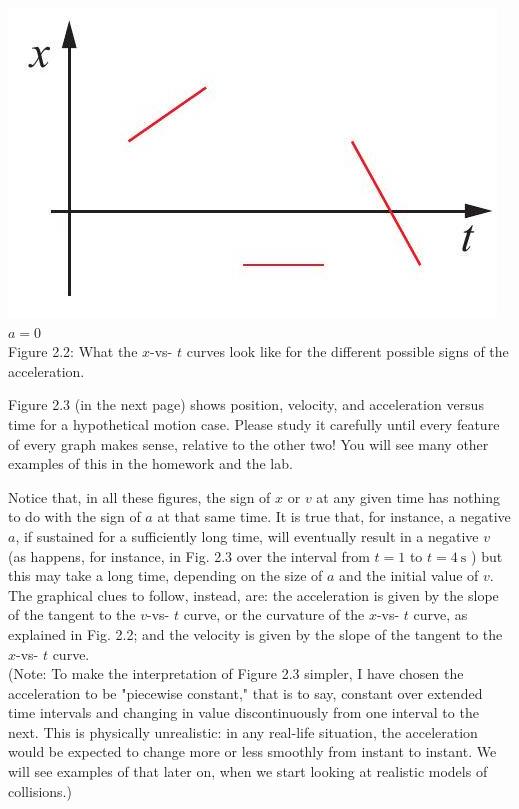 \documentclass[10pt]{article}
\begin{document}
\includegraphics[max width=\textwidth, center]{2024_09_14_9969b06773f10b6936e8g-055(1)}\\
$a=0$\\
Figure 2.2: What the $x$-vs- $t$ curves look like for the different possible signs of the acceleration.

Figure 2.3 (in the next page) shows position, velocity, and acceleration versus time for a hypothetical motion case. Please study it carefully until every feature of every graph makes sense, relative to the other two! You will see many other examples of this in the homework and the lab.

Notice that, in all these figures, the sign of $x$ or $v$ at any given time has nothing to do with the sign of $a$ at that same time. It is true that, for instance, a negative $a$, if sustained for a sufficiently long time, will eventually result in a negative $v$ (as happens, for instance, in Fig. 2.3 over the interval from $t=1$ to $t=4 \mathrm{~s}$ ) but this may take a long time, depending on the size of $a$ and the initial value of $v$. The graphical clues to follow, instead, are: the acceleration is given by the slope of the tangent to the $v$-vs- $t$ curve, or the curvature of the $x$-vs- $t$ curve, as explained in Fig. 2.2; and the velocity is given by the slope of the tangent to the $x$-vs- $t$ curve.\\
(Note: To make the interpretation of Figure 2.3 simpler, I have chosen the acceleration to be "piecewise constant," that is to say, constant over extended time intervals and changing in value discontinuously from one interval to the next. This is physically unrealistic: in any real-life situation, the acceleration would be expected to change more or less smoothly from instant to instant. We will see examples of that later on, when we start looking at realistic models of collisions.)
\end{document}
